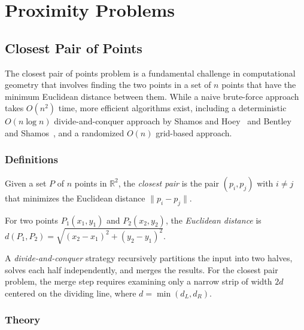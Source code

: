 \chapter{Proximity Problems}
\label{ch:proximity}

\section{Closest Pair of Points}
\label{sec:closest_pair}

The closest pair of points problem is a fundamental challenge in computational geometry that involves finding the two points in a set of $n$ points that have the minimum Euclidean distance between them. While a naive brute-force approach takes $O(n^2)$ time, more efficient algorithms exist, including a deterministic $O(n \log n)$ divide-and-conquer approach by Shamos and Hoey~\cite{shamos1975} and Bentley and Shamos~\cite{bentley1976}, and a randomized $O(n)$ grid-based approach.

\subsection{Definitions}

\begin{definition}\label{def:closest_pair}
Given a set $P$ of $n$ points in $\mathbb{R}^2$, the \emph{closest pair} is the pair $(p_i, p_j)$ with $i \ne j$ that minimizes the Euclidean distance $\|p_i - p_j\|$.
\end{definition}

\begin{definition}\label{def:euclidean_distance}
For two points $P_1(x_1, y_1)$ and $P_2(x_2, y_2)$, the \emph{Euclidean distance} is $d(P_1, P_2) = \sqrt{(x_2-x_1)^2 + (y_2-y_1)^2}$.
\end{definition}

\begin{definition}\label{def:dc_strategy}
A \emph{divide-and-conquer} strategy recursively partitions the input into two halves, solves each half independently, and merges the results. For the closest pair problem, the merge step requires examining only a narrow strip of width $2d$ centered on the dividing line, where $d = \min(d_L, d_R)$.
\end{definition}

\subsection{Theory}

